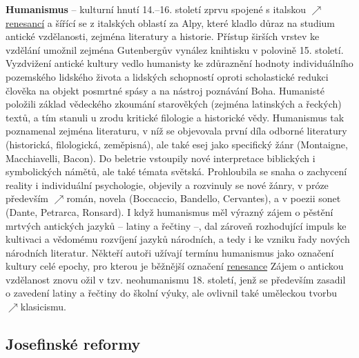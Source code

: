 \documentclass{article}
\begin{document}
  {\bf Humanismus} -- kulturní hnutí 14.--16. století zprvu spojené s italskou $\nearrow$\hyperref[sec:renesance]{renesancí} a šířící se z italských oblastí za Alpy, které kladlo důraz na studium antické vzdělanosti, zejména literatury a historie. Přístup širších vrstev ke vzdělání umožnil zejména Gutenbergův vynález knihtisku v polovině 15. století. Vyzdvižení antické kultury vedlo humanisty ke zdůraznění hodnoty individuálního pozemského lidského života a lidských schopností oproti scholastické redukci člověka na objekt posmrtné spásy a na nástroj poznávání Boha. Humanisté položili základ vědeckého zkoumání starověkých (zejména latinských a řeckých) textů, a tím stanuli u zrodu kritické filologie a historické vědy. Humanismus tak poznamenal zejména literaturu, v níž se objevovala první díla odborné literatury (historická, filologická, zeměpisná), ale také esej jako specifický žánr (Montaigne, Macchiavelli, Bacon). Do beletrie vstoupily nové interpretace biblických i symbolických námětů, ale také témata světská. Prohloubila se snaha o zachycení reality i individuální psychologie, objevily a rozvinuly se nové žánry, v próze především $\nearrow$román, novela (Boccaccio, Bandello, Cervantes), a v poezii sonet (Dante, Petrarca, Ronsard). I když humanismus měl výrazný zájem o pěstění mrtvých antických jazyků -- latiny a řečtiny --, dal zároveň rozhodující impuls ke kultivaci a vědomému rozvíjení jazyků národních, a tedy i ke vzniku řady nových národních literatur. Někteří autoři užívají termínu humanismus jako označení kultury celé epochy, pro kterou je běžnější označení \hyperref[sec:renesance]{renesance} Zájem o antickou vzdělanost znovu ožil v tzv. neohumanismu 18. století, jenž se především zasadil o zavedení latiny a řečtiny do školní výuky, ale ovlivnil také uměleckou tvorbu $\nearrow$klasicismu.

  \subsection*{Josefinské reformy~\cite{Hroch:}}
  \label{sec:josefinskeReformy}
\end{document}
